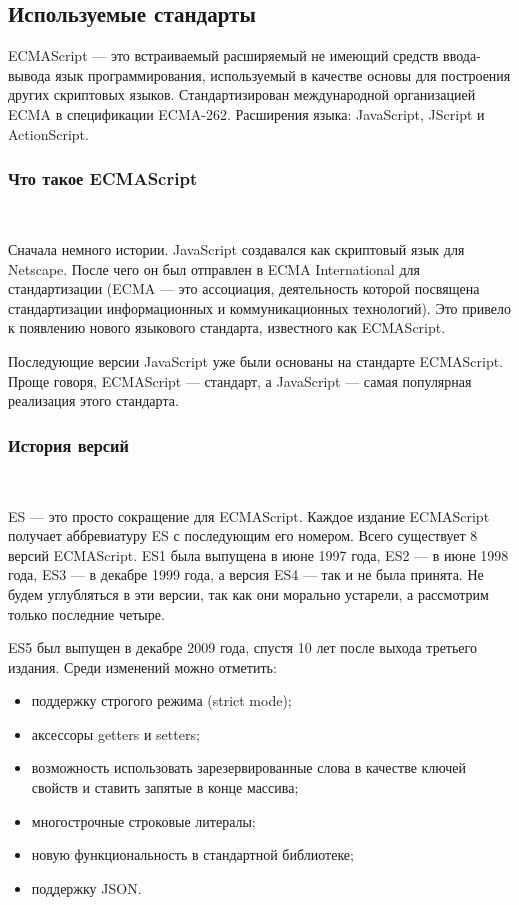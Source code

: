 \subsection{Используемые стандарты}
\label{sec:modeling:ecma}

ECMAScript — это встраиваемый расширяемый не имеющий средств ввода-вывода язык программирования, используемый в качестве основы для построения других скриптовых языков. Стандартизирован международной организацией ECMA в спецификации ECMA-262. Расширения языка: JavaScript, JScript и ActionScript.

\subsubsection{Что такое ECMAScript}
\
\newline

Сначала немного истории. JavaScript создавался как скриптовый язык для Netscape. После чего он был отправлен в ECMA International для стандартизации (ECMA — это ассоциация, деятельность которой посвящена стандартизации информационных и коммуникационных технологий). Это привело к появлению нового языкового стандарта, известного как ECMAScript.

Последующие версии JavaScript уже были основаны на стандарте ECMAScript. Проще говоря, ECMAScript — стандарт, а JavaScript — самая популярная реализация этого стандарта.

\subsubsection{История версий}
\
\newline

ES — это просто сокращение для ECMAScript. Каждое издание ECMAScript получает аббревиатуру ES с последующим его номером. Всего существует 8 версий ECMAScript. ES1 была выпущена в июне 1997 года, ES2 — в июне 1998 года, ES3 — в декабре 1999 года, а версия ES4 — так и не была принята. Не будем углубляться в эти версии, так как они морально устарели, а рассмотрим только последние четыре.

ES5 был выпущен в декабре 2009 года, спустя 10 лет после выхода третьего издания. Среди изменений можно отметить:

\begin{itemize}
    \item поддержку строгого режима (strict mode);
    \item аксессоры getters и setters;
    \item возможность использовать зарезервированные слова в качестве ключей свойств и ставить запятые в конце массива;
    \item многострочные строковые литералы;
    \item новую функциональность в стандартной библиотеке;
    \item поддержку JSON.
\end{itemize}

